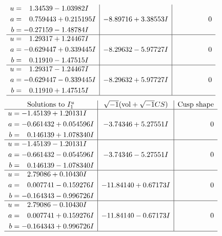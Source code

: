 \documentclass[1p]{elsarticle_modified}
\theoremstyle{definition}
\newcommand{\I}{\sqrt{-1}}
\begin{document}
$$\begin{array}{c|c|c}
\begin{aligned}
u &= \phantom{-}1.34539 - 1.03982 I \\
a &= \phantom{-}0.759443 + 0.215195 I \\
b &= -0.27159 - 1.48784 I\end{aligned}
 & -8.89716 + 3.38553 I & \phantom{-0.000000 } 0 \\ \hline\begin{aligned}
u &= \phantom{-}1.29317 + 1.24467 I \\
a &= -0.629447 + 0.339445 I \\
b &= \phantom{-}0.11910 - 1.47515 I\end{aligned}
 & -8.29632 - 5.97727 I & \phantom{-0.000000 } 0 \\ \hline\begin{aligned}
u &= \phantom{-}1.29317 - 1.24467 I \\
a &= -0.629447 - 0.339445 I \\
b &= \phantom{-}0.11910 + 1.47515 I\end{aligned}
 & -8.29632 + 5.97727 I & \phantom{-0.000000 } 0\\
 \hline 
 \end{array}$$\newpage$$\begin{array}{c|c|c}  
\text{Solutions to }I^u_{1}& \I (\text{vol} + \sqrt{-1}CS) & \text{Cusp shape}\\
 \hline 
\begin{aligned}
u &= -1.45139 + 1.20131 I \\
a &= -0.661432 + 0.054596 I \\
b &= \phantom{-}0.146139 + 1.078340 I\end{aligned}
 & -3.74346 + 5.27551 I & \phantom{-0.000000 } 0 \\ \hline\begin{aligned}
u &= -1.45139 - 1.20131 I \\
a &= -0.661432 - 0.054596 I \\
b &= \phantom{-}0.146139 - 1.078340 I\end{aligned}
 & -3.74346 - 5.27551 I & \phantom{-0.000000 } 0 \\ \hline\begin{aligned}
u &= \phantom{-}2.79086 + 0.10430 I \\
a &= \phantom{-}0.007741 - 0.159276 I \\
b &= -0.164343 - 0.996726 I\end{aligned}
 & -11.84140 + 0.67173 I & \phantom{-0.000000 } 0 \\ \hline\begin{aligned}
u &= \phantom{-}2.79086 - 0.10430 I \\
a &= \phantom{-}0.007741 + 0.159276 I \\
b &= -0.164343 + 0.996726 I\end{aligned}
 & -11.84140 - 0.67173 I & \phantom{-0.000000 } 0\\
 \hline 
 \end{array}$$\newpage\newpage\renewcommand{\arraystretch}{1}
\end{document}
